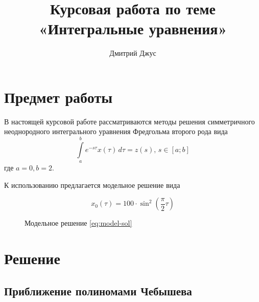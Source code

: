 \documentclass[11pt]{article}
\numberwithin{equation}{section}
\newcommand{\intl}{\int\limits}
\newcommand{\mul}{\cdot}
\begin{document}
\author{Дмитрий Джус}
\title{Курсовая работа по теме \\
  \Huge{«Интегральные уравнения»}}
\pretitle{\begin{center}\LARGE}
  \posttitle{\par\end{center}\vskip 3pc}
\date{}
\maketitle
\thispagestyle{empty}

\clearpage
\tableofcontents

\clearpage
\section{Предмет работы}
\label{sec:problem}
В настоящей курсовой работе рассматриваются методы решения
симметричного неоднородного интегрального уравнения Фредгольма второго
рода вида
\begin{equation}
  \label{eq:ieqgen}
  \intl_a^b {e^{-s\tau}x(\tau)\,d\tau} = z(s),\, s\in [a;b]
\end{equation}
где $a = 0, b = 2$.

К использованию предлагается модельное решение вида

\begin{equation}
  \label{eq:model-sol}
  x_0(\tau) = 100 \mul \sin^2\left(\frac{\pi}{2}\tau\right)
\end{equation}

\begin{figure}[!htb]
  \centering
  \caption{Модельное решение \eqref{eq:model-sol}}
  \label{fig:model-sol}
\end{figure}

\section{Решение}

\subsection{Приближение полиномами Чебышева}
\end{document}
